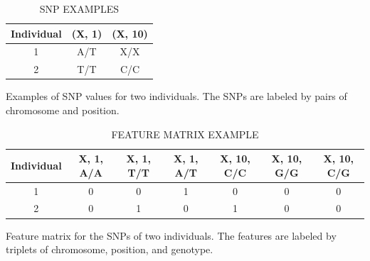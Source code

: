 \begin{table}[H]
  \begin{center}
    \caption{SNP EXAMPLES}
    \begin{tabular}{ c c c }
      \hline
      \textbf{Individual} & \textbf{(X, 1)} & \textbf{(X, 10)} \\ \hline
      1 & A/T & X/X \\
      2 & T/T & C/C \\
    \end{tabular}
  \end{center}

  Examples of SNP values for two individuals.  The SNPs are labeled by pairs of chromosome and position.
  \label{tab:encoding-example-snps}
\end{table}

\begin{table}[H]
  \begin{center}
    \caption{FEATURE MATRIX EXAMPLE}
    \begin{tabular}{ c c c c c c c }
      \hline
      \textbf{Individual} & \textbf{X, 1, A/A} & \textbf{X, 1, T/T} & \textbf{X, 1, A/T} & \textbf{X, 10, C/C} & \textbf{X, 10, G/G} &\textbf{X, 10, C/G} \\ \hline
      1 & 0 & 0 & 1 & 0 & 0 & 0 \\
      2 & 0 & 1 & 0 & 1 & 0 & 0 \\
    \end{tabular}
  \end{center}
  
  Feature matrix for the SNPs of two individuals.  The features are labeled by triplets of chromosome, position, and genotype.
  \label{tab:encoding-example-features}
\end{table}

